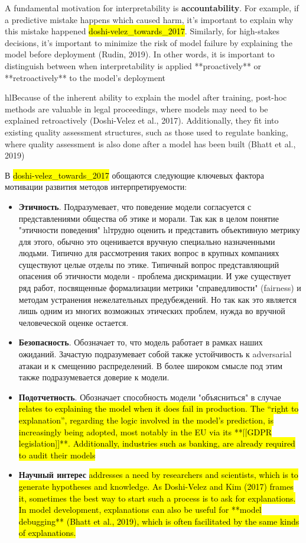 A fundamental motivation for interpretability is \textbf{accountability}. For example, if a predictive mistake happens which caused harm, it’s important to explain why this mistake happened \hl{doshi-velez_towards_2017}. Similarly, for high-stakes decisions, it’s important to minimize the risk of model failure by explaining the model before deployment (Rudin, 2019). In other words, it is important to distinguish between when interpretability is applied **proactively** or **retroactively** to the model’s deployment 

hl{Because of the inherent ability to explain the model after training, post-hoc methods are valuable in legal proceedings, where models may need to be explained retroactively (Doshi-Velez et al., 2017). Additionally, they fit into existing quality assessment structures, such as those used to regulate banking, where quality assessment is also done after a model has been built (Bhatt et al., 2019)}

В \cite{madsen_post-hoc_2021} \hl{doshi-velez_towards_2017} обощаются следующие ключевых фактора мотивации развития методов интерпретируемости:

\begin{itemize}
    \item \textbf{Этичность}. Подразумевает, что поведение модели согласуется с представлениями общества об этике и морали. Так как в целом понятие "этичности поведения" hl{трудно оценить и представить объективную метрику} для этого, обычно это оценивается вручную специально назначенными людьми. Типично для рассмотрения таких вопрос в крупных компаниях существуют целые отделы по этике.
    Типичный вопрос представляющий опасения об этичности  модели - проблема дискримации. И уже существует ряд работ, посвященные формализации метрики "справедливости" (fairness) и методам устранения нежелательных предубеждений. Но так как это является лишь одним из многих возможных этических проблем, нужда во вручной человеческой оценке остается.
    \item \textbf{Безопасность}. Обозначает то, что модель работает в рамках наших ожиданий. Зачастую подразумевает собой также устойчивость к adversarial атакаи и к смещению распределений. В более широком смысле \cite{lipton_mythos_2018} под этим также подразумевается доверие к модели.
    \item \textbf{Подотчетность}. Обозначает способность модели "объясниться" в случае  \hl{relates to explaining the model when it does fail in production. The “right to explanation”, regarding the logic involved in the model’s prediction, is increasingly being adopted, most notably in the EU via its **[[GDPR legislation]]**. Additionally, industries such as banking, are already required to audit their models}
    \item \textbf{Научный интерес} \hl{addresses a need by researchers and scientists, which is to generate hypotheses and knowledge. As Doshi-Velez and Kim (2017) frames it, sometimes the best way to start such a process is to ask for explanations. In model development, explanations can also be useful for **model debugging** (Bhatt et al., 2019), which is often facilitated by the same kinds of explanations.}
\end{itemize}



